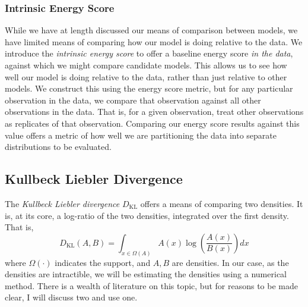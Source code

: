 
\subsubsection{Intrinsic Energy Score}
While we have at length discussed our means of comparison between models, we have limited means of
  comparing how our model is doing relative to the data.  We introduce the
  \emph{intrinsic energy score} to offer a baseline energy score \emph{in the data}, against which
  we might compare candidate models.  This allows us to see how well our model is doing relative
  to the data, rather than just relative to other models.  We construct this using the energy score
  metric, but for any particular observation in the data, we compare that observation against all
  other observations in the data.  That is, for a given observation, treat other observations as
  replicates of that observation.  Comparing our energy score results against this value offers a
  metric of how well we are partitioning the data into separate distributions to be evaluated.

\subsection{Kullbeck Liebler Divergence}
The \emph{Kullbeck Liebler divergence} $D_{\text{KL}}$ offers a means of comparing two densities.
  It is, at its core, a log-ratio of the two densities, integrated over the first density.  That is,
  \begin{equation}
    \label{eqn:kld}
    D_{\text{KL}}(A,B) = \int_{x\in \Omega(A)}A(x)\log\left(\frac{A(x)}{B(x)}\right)dx
  \end{equation}
  where $\Omega(\cdot)$ indicates the support, and $A,B$ are densities.  In our case, as the
  densities are intractible, we will be estimating the densities using a numerical
  method.  There is a wealth of literature on this topic, but for reasons to be made clear, I will
  discuss two and use one.

